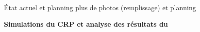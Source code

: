        {
       	\setlength\pdfpagewidth{12.8cm}%
       	\setlength\pdfpageheight{11.5cm}%
       \begin{frame}[plain]
       	
       \end{frame}
	    }

    \begin{frame}{État actuel et planning}
        plus de photos (remplissage) et planning
    \end{frame}

    {
        \begin{specialframe}
            \vspace{2cm}\hspace*{-1.8cm}\parbox[t]{\textwidth}{
                \begin{center}
                    \begin{Huge}
                            \textcolor{pheniics_purple}{\textbf{Simulations du CRP et analyse des résultats du \TOO{}}}
                    \end{Huge}
                \end{center}
            }
        \end{specialframe}
    }

